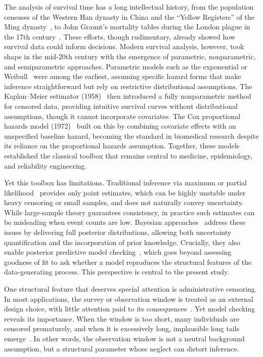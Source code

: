 The analysis of survival time has a long intellectual history, from the population censuses of the Western Han dynasty in China and the “Yellow Registers” of the Ming dynasty~\cite{von2012household}, to John Graunt’s mortality tables during the London plague in the 17th century~\cite{doi:10.1177/09677720221079826}. These efforts, though rudimentary, already showed how survival data could inform decisions. Modern survival analysis, however, took shape in the mid-20th century with the emergence of parametric, nonparametric, and semiparametric approaches. Parametric models such as the exponential or Weibull~\cite{ibrahim2013bayesian} were among the earliest, assuming specific hazard forms that make inference straightforward but rely on restrictive distributional assumptions. The Kaplan–Meier estimator (1958)~\cite{liu2012survival, kleinbaum1996survival} then introduced a fully nonparametric method for censored data, providing intuitive survival curves without distributional assumptions, though it cannot incorporate covariates. The Cox proportional hazards model (1972)~\cite{Efron01091977, liu2012survival} built on this by combining covariate effects with an unspecified baseline hazard, becoming the standard in biomedical research despite its reliance on the proportional hazards assumption. Together, these models established the classical toolbox that remains central to medicine, epidemiology, and reliability engineering.

Yet this toolbox has limitations. Traditional inference via maximum or partial likelihood~\cite{bartovs2022informed, kalbfleisch2002statistical} provides only point estimates, which can be highly unstable under heavy censoring or small samples, and does not naturally convey uncertainty. While large-sample theory guarantees consistency, in practice such estimates can be misleading when event counts are low. 
Bayesian approaches~\cite{gelman1995bayesian} address these issues by delivering full posterior distributions, allowing both uncertainty quantification and the incorporation of prior knowledge. Crucially, they also enable posterior predictive model checking~\cite{gelman1995bayesian, https://doi.org/10.1002/ecm.1314}, which goes beyond assessing goodness of fit to ask whether a model reproduces the structural features of the data-generating process. This perspective is central to the present study.

One structural feature that deserves special attention is administrative censoring. In most applications, the survey or observation window is treated as an external design choice, with little attention paid to its consequences~\cite{barrajón2020effectrightcensoringbias, bartovs2022informed}. Yet model checking reveals its importance. When the window is too short, many individuals are censored prematurely, and when it is excessively long, implausible long tails emerge~\cite{barrajón2020effectrightcensoringbias}. In other words, the observation window is not a neutral background assumption, but a structural parameter whose neglect can distort inference.

